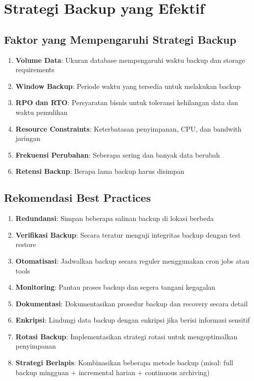 \section{Strategi Backup yang Efektif}

\subsection{Faktor yang Mempengaruhi Strategi Backup}
\begin{enumerate}
    \item \textbf{Volume Data}: Ukuran database mempengaruhi waktu backup dan storage requirements
    \item \textbf{Window Backup}: Periode waktu yang tersedia untuk melakukan backup
    \item \textbf{RPO dan RTO}: Persyaratan bisnis untuk toleransi kehilangan data dan waktu pemulihan
    \item \textbf{Resource Constraints}: Keterbatasan penyimpanan, CPU, dan bandwith jaringan
    \item \textbf{Frekuensi Perubahan}: Seberapa sering dan banyak data berubah
    \item \textbf{Retensi Backup}: Berapa lama backup harus disimpan
\end{enumerate}

\subsection{Rekomendasi Best Practices}
\begin{enumerate}
    \item \textbf{Redundansi}: Simpan beberapa salinan backup di lokasi berbeda
    \item \textbf{Verifikasi Backup}: Secara teratur menguji integritas backup dengan test restore
    \item \textbf{Otomatisasi}: Jadwalkan backup secara reguler menggunakan cron jobs atau tools
    \item \textbf{Monitoring}: Pantau proses backup dan segera tangani kegagalan
    \item \textbf{Dokumentasi}: Dokumentasikan prosedur backup dan recovery secara detail
    \item \textbf{Enkripsi}: Lindungi data backup dengan enkripsi jika berisi informasi sensitif
    \item \textbf{Rotasi Backup}: Implementasikan strategi rotasi untuk mengoptimalkan penyimpanan
    \item \textbf{Strategi Berlapis}: Kombinasikan beberapa metode backup (misal: full backup mingguan + incremental harian + continuous archiving)
\end{enumerate}
